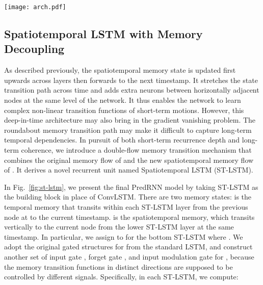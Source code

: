 \documentclass[10pt,journal,compsoc]{IEEEtran}
\let\MYoriglatexcaption\caption
\renewcommand{\caption}[2][\relax]{\MYoriglatexcaption[#2]{#2}}
\newcommand{\fig}[1]{Fig.~\ref{#1}}
\begin{document}
\begin{figure*}[t]
  \centering
  \texttt{[image: arch.pdf]}
  \vspace{-10pt}
  \caption{\textbf{Left:} the main architecture of PredRNN, in which the orange arrows denote the state transition paths of , namely the spatiotemporal memory flow.
\textbf{Right:} the Spatiotemporal LSTM unit with twisted memory states that serves as the building block of the proposed PredRNN, where the orange circles denote the unique structures compared with ConvLSTM.}
  \label{fig:st-lstm}
\end{figure*}

\subsection{Spatiotemporal LSTM with Memory Decoupling}


As described previously, the spatiotemporal memory state is updated first upwards across layers then forwards to the next timestamp.
It stretches the state transition path across time and adds extra neurons between horizontally adjacent nodes at the same level of the network. It thus enables the network to learn complex non-linear transition functions of short-term motions.
However, this deep-in-time architecture may also bring in the gradient vanishing problem. The roundabout memory transition path may make it difficult to capture long-term temporal dependencies. 
In pursuit of both short-term recurrence depth and long-term coherence, we introduce a double-flow memory transition mechanism that combines the original memory flow of  and the new spatiotemporal memory flow of . 
It derives a novel recurrent unit named Spatiotemporal LSTM (ST-LSTM). 


In \fig{fig:st-lstm}, we present the final PredRNN model by taking ST-LSTM as the building block in place of ConvLSTM. 
There are two memory states:  is the temporal memory that transits within each ST-LSTM layer from the previous node at  to the current timestamp. 
 is the spatiotemporal memory, which transits vertically to the current node from the lower  ST-LSTM layer at the same timestamp. 
In particular, we assign  to  for the bottom ST-LSTM where . 
We adopt the original gated structures for  from the standard LSTM, and construct another set of input gate , forget gate , and input modulation gate  for , because the memory transition functions in distinct directions are supposed to be controlled by different signals.
Specifically, in each ST-LSTM, we compute:
\end{document}

